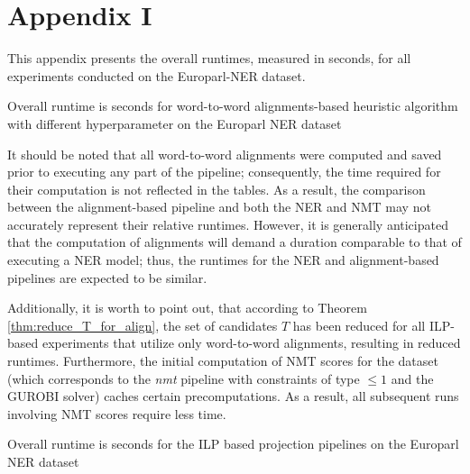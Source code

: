 \chapter{Appendix I}
\label{sec:appendix}

This appendix presents the overall runtimes, measured in seconds, for all experiments conducted on the Europarl-NER dataset.

\begin{table}[ht]
  \centering
  
  \caption{Overall runtime is seconds for word-to-word alignments-based heuristic
  algorithm with different hyperparameter  on the Europarl NER dataset}
  \label{tab:europarl_heur_runtime}
\end{table}

It should be noted that all word-to-word alignments were computed
and saved prior to executing any part of the pipeline; consequently,
the time required for their computation is not reflected in the
tables. As a result, the comparison between the alignment-based pipeline
and both the NER and NMT may not accurately represent their
relative runtimes. However, it is generally anticipated that
the computation of alignments will demand a duration comparable
to that of executing a NER model; thus, the runtimes for the
NER and alignment-based pipelines are expected to be similar.

Additionally, it is worth to point out, that according to Theorem \ref{thm:reduce_T_for_align},
the set of candidates \( T \) has been reduced for all ILP-based experiments that
utilize only word-to-word alignments, resulting in reduced runtimes. Furthermore, the initial
computation of NMT scores for the dataset (which corresponds to the \textit{nmt}
pipeline with constraints of type \( \leq 1 \) and the GUROBI solver) caches certain
precomputations. As a result, all subsequent runs involving NMT scores require
less time.

\begin{table}[t]
  \centering
  
  \caption{Overall runtime is seconds for the ILP based projection pipelines
  on the Europarl NER dataset}
  \label{tab:europarl_ilp_runtime}
\end{table}
